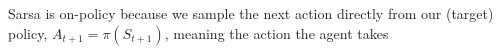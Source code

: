 Sarsa is on-policy because we sample the next action directly from our (target) policy, $A_{t+1} = \pi(S_{t+1})$,
meaning the action the agent takes 